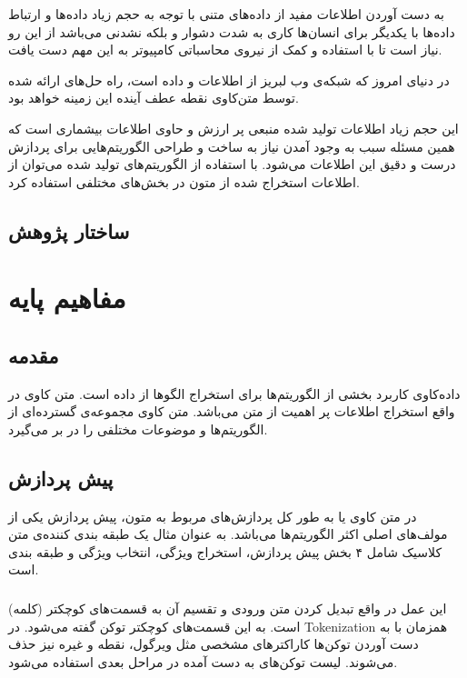 \documentclass[12pt, a4paper, oneside]{report}
\begin{document}
به دست آوردن اطلاعات مفید از داده‌های متنی با توجه به حجم زیاد داده‌ها و ارتباط داده‌ها با یکدیگر
برای انسان‌ها کاری به شدت دشوار و بلکه نشدنی می‌باشد از این رو نیاز است تا با استفاده و کمک
از نیروی محاسباتی کامپیوتر به این مهم دست یافت.
\cite{zhang2018deep}

در دنیای امروز که شبکه‌ی وب لبریز از اطلاعات و داده است، راه حل‌های ارائه شده توسط متن‌کاوی نقطه
عطف آینده این زمینه خواهد بود\cite{8844895}.


این حجم زیاد اطلاعات تولید شده منبعی پر ارزش و حاوی اطلاعات بیشماری است که همین مسئله سبب به وجود آمدن نیاز به
ساخت و طراحی الگوریتم‌هایی برای پردازش درست و دقیق این اطلاعات می‌شود. با استفاده از الگوریتم‌های تولید شده می‌توان از
اطلاعات استخراج شده از متون در بخش‌های مختلفی استفاده کرد\cite{DBLP:journals/corr/AllahyariPASTGK17a}.


\section{ساختار پژوهش}

\chapter{مفاهیم پایه}
\pagebreak
\section{مقدمه}

داده‌کاوی کاربرد بخشی از الگوریتم‌ها برای استخراج الگو‌ها از داده است. متن کاوی در واقع استخراج اطلاعات پر اهمیت از
متن می‌باشد. متن کاوی مجموعه‌ی گسترده‌ای از الگوریتم‌ها و موضوعات مختلفی را در بر می‌گیرد\cite{c9d4fbeac7324056bed5d1cb262a7268}.

\section{پیش پردازش}

در متن کاوی یا به طور کل پردازش‌های مربوط به متون، پیش پردازش یکی از مولف‌های اصلی اکثر الگوریتم‌ها می‌باشد.
به عنوان مثال یک طبقه بندی کننده‌ی متن کلاسیک شامل ۴ بخش پیش پردازش، استخراج ویژگی، انتخاب ویژگی و طبقه بندی است\cite{DBLP:journals/corr/AllahyariPASTGK17a}.

\subsection{}

این عمل در واقع تبدیل کردن متن ورودی و تقسیم آن به قسمت‌های کوچکتر
(کلمه)
است. به این قسمت‌های کوچکتر توکن گفته می‌شود. در
Tokenization
همزمان با به دست آوردن توکن‌ها کاراکتر‌های مشخصی مثل ویرگول، نقطه و غیره نیز حذف می‌شوند.
لیست توکن‌های به دست آمده در مراحل بعدی استفاده می‌شود\cite{DBLP:journals/corr/AllahyariPASTGK17a}.
\end{document}
